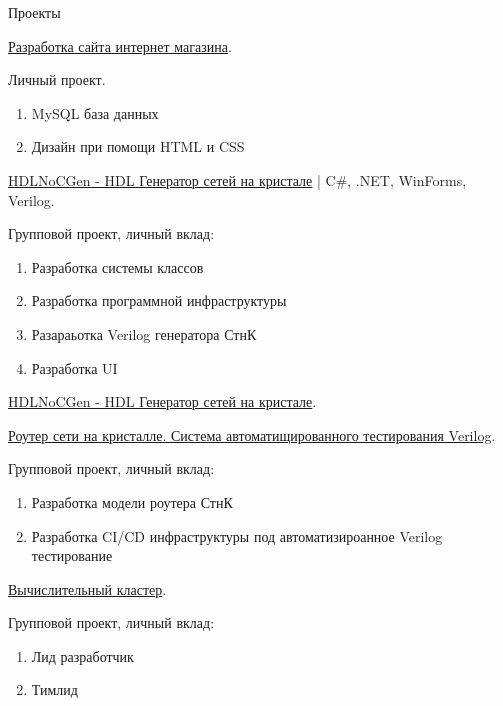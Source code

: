 \begin{rubric}{Проекты}

\entry*[2023] \href{https://github.com/Elgrush/GoldFinger}{Разработка сайта интернет магазина}.

Личный проект.

\begin{enumerate}
  \item MySQL база данных
  \item Дизайн при помощи HTML и CSS
\end{enumerate}
\entry*[2023-2024]\href{https://drive.google.com/drive/folders/1UaEPuE1M2vIYpUWMorWQyj1NkYkr4I3a}{HDLNoCGen - HDL Генератор сетей на кристале} | C\#, .NET, WinForms, Verilog.

Групповой проект, личный вклад:

\begin{enumerate}
  \item Разработка системы классов
  \item Разработка программной инфраструктуры
  \item Разараьотка Verilog генератора СтнК
  \item Разработка UI
\end{enumerate}

\entry*[2024]\href{https://github.com/Elgrush/HDLNoCGen---verilog-prototype}{HDLNoCGen - HDL Генератор сетей на кристале}.

%

\entry*[2026] \href{https://github.com/apoj-inc/AXI-NoC-with-built-in-PMUs}{Роутер сети на кристалле. Система автоматищированного тестирования Verilog}.

Групповой проект, личный вклад:

\begin{enumerate}
  \item Разработка модели роутера СтнК
  \item Разработка CI/CD инфраструктуры под автоматизироанное Verilog тестирование
\end{enumerate}

\entry*[2026] \href{https://github.com/apoj-inc/drg}{Вычислительный кластер}.

Групповой проект, личный вклад:

\begin{enumerate}
  \item Лид разработчик
  \item Тимлид
\end{enumerate}

\end{rubric}
